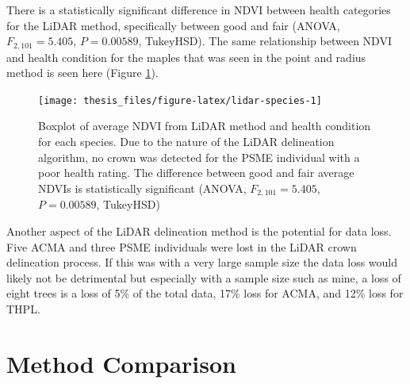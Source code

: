 \documentclass[12pt,twoside]{reedthesis}
\begin{document}
There is a statistically significant difference in NDVI between health categories for the LiDAR method, specifically between good and fair (ANOVA, \(F_{2,101} = 5.405\), \(P = 0.00589\), TukeyHSD). The same relationship between NDVI and health condition for the maples that was seen in the point and radius method is seen here (Figure \ref{fig:lidar-species}).
\begin{figure}
\texttt{[image: thesis\_files/figure-latex/lidar-species-1]} \caption[NDVI and health condition for LiDAR method]{Boxplot of average NDVI from LiDAR method and health condition for each species. Due to the nature of the LiDAR delineation algorithm, no crown was detected for the PSME individual with a poor health rating. The difference between good and fair average NDVIs is statistically significant (ANOVA, $F_{2,101} = 5.405$, $P = 0.00589$, TukeyHSD)}\label{fig:lidar-species}
\end{figure}
Another aspect of the LiDAR delineation method is the potential for data loss. Five ACMA and three PSME individuals were lost in the LiDAR crown delineation process. If this was with a very large sample size the data loss would likely not be detrimental but especially with a sample size such as mine, a loss of eight trees is a loss of 5\% of the total data, 17\% loss for ACMA, and 12\% loss for THPL.

\hypertarget{method-comparison}{%
\section{Method Comparison}\label{method-comparison}}
\end{document}

